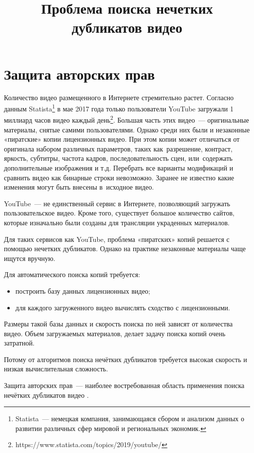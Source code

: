 \documentclass{.local/lib/classes/ndvr-super-article-standalone}
\title[NDVR thesis-abstract]{%
    Проблема поиска нечетких дубликатов видео%
}
\begin{document}
    \section{Защита авторских прав}

    Количество видео размещенного в Интернете стремительно растет.
    Согласно данным Statista\footnote{
        Statista~— немецкая компания, занимающаяся
        сбором и анализом данных о развитии различных сфер мировой
        и региональных экономик.  
    } в мае 2017 года только пользователи YouTube загружали 
    1 миллиард часов видео каждый день\footnote{
        https://www.statista.com/topics/2019/youtube/
    }.
    Большая часть этих видео~— оригинальные материалы,
    снятые самими пользователями.
    Однако среди них были и незаконные «пиратские» копии лицензионных видео.
    При этом копии может отличаться от оригинала
    набором различных параметров, таких 
    как~разрешение, контраст, яркость, субтитры,
    частота кадров, последовательность сцен, или~содержать
    дополнительные изображения и т.д.
    Перебрать все варианты модификаций 
    и сравнить видео как бинарные строки невозможно.
    Заранее не известно какие изменения могут быть 
    внесены в~исходное видео.

    YouTube~— не единственный сервис в Интернете, 
    позволяющий загружать пользовательское видео.
    Кроме того, существует большое количество сайтов,
    которые изначально были созданы 
    для трансляции украденных материалов.

    Для таких сервисов как YouTube,
    проблема «пиратских» копий решается 
    с помощью нечетких дубликатов.
    Однако на практике незаконные 
    материалы чаще ищутся вручную.

    Для автоматического поиска копий требуется:
    \begin{itemize}
        \item   построить базу данных лицензионных видео;
        \item   для каждого загруженного видео вычислять 
                сходство с лицензионными.
    \end{itemize}
    Размеры такой базы данных и скорость 
    поиска по ней зависят от количества видео.
    Объем загружаемых материалов,
    делает задачу поиска копий очень затратной. 

    Потому от алгоритмов поиска нечётких дубликатов
    требуется высокая скорость и низкая вычислительная сложность. 

    Защита авторских прав~— наиболее востребованная 
    область применения поиска нечётких дубликатов видео
    \cite{Assent:2009, Cherubini:2009, Shen:2007, Law-To:2007}.
\end{document}
